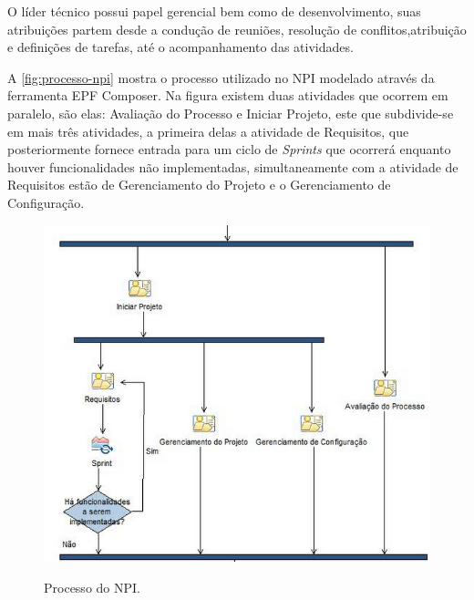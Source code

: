 O líder técnico possui papel gerencial bem como de desenvolvimento, suas atribuições partem desde a condução de reuniões, resolução de conflitos,atribuição e definições de tarefas, até o acompanhamento das atividades. 

A \autoref{fig:processo-npi} mostra o processo utilizado no NPI modelado através da ferramenta EPF Composer. Na figura	existem duas atividades que ocorrem em paralelo, são elas: Avaliação do Processo e Iniciar Projeto, este que subdivide-se em mais três atividades, a primeira delas a atividade de Requisitos, que posteriormente fornece entrada para um ciclo de \textit{Sprints} que ocorrerá enquanto houver funcionalidades não implementadas, simultaneamente com a atividade de Requisitos estão de Gerenciamento do Projeto e o Gerenciamento de Configuração.
\begin{figure}[H]
\centering
\caption[Processo do NPI]{Processo do NPI.}
\includegraphics[scale=0.8]{./images/processo-npi}
\label{fig:processo-npi}
\end{figure}


